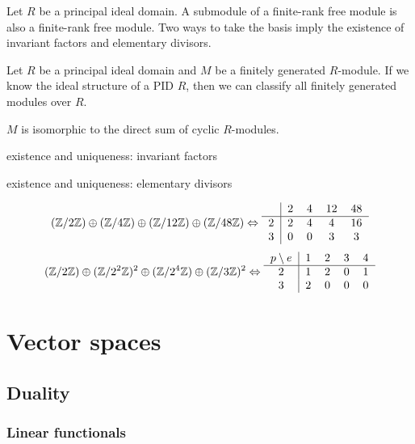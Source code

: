 \documentclass{../../large}
\begin{document}
\begin{prb}
Let $R$ be a principal ideal domain.
A submodule of a finite-rank free module is also a finite-rank free module.
Two ways to take the basis imply the existence of invariant factors and elementary divisors.
\end{prb}

\begin{prb}
Let $R$ be a principal ideal domain and $M$ be a finitely generated $R$-module.
If we know the ideal structure of a PID $R$, then we can classify all finitely generated modules over $R$.
\begin{parts}
\item $M$ is isomorphic to the direct sum of cyclic $R$-modules.
\item existence and uniqueness: invariant factors
\item existence and uniqueness: elementary divisors
\end{parts}
\end{prb}

\[
(\Z/2\Z)\oplus(\Z/4\Z)\oplus(\Z/12\Z)\oplus(\Z/48\Z)
\Leftrightarrow
\begin{tabular}{c|cccc}
& 2 & 4 & 12 & 48 \\\hline
2 & 2 & 4 & 4 & 16 \\
3 & 0 & 0 & 3 & 3
\end{tabular}
\]
\[
(\Z/2\Z)\oplus(\Z/2^2\Z)^2\oplus(\Z/2^4\Z)\oplus(\Z/3\Z)^2
\Leftrightarrow
\begin{tabular}{c|cccc}
$p\setminus e$ & 1 & 2 & 3 & 4 \\\hline
2 & 1 & 2 & 0 & 1 \\
3 & 2 & 0 & 0 & 0
\end{tabular}
\]




\part{Vector spaces}


\chapter{Duality}
\section{Linear functionals}

\begin{prb}
\end{prb}
\end{document}
